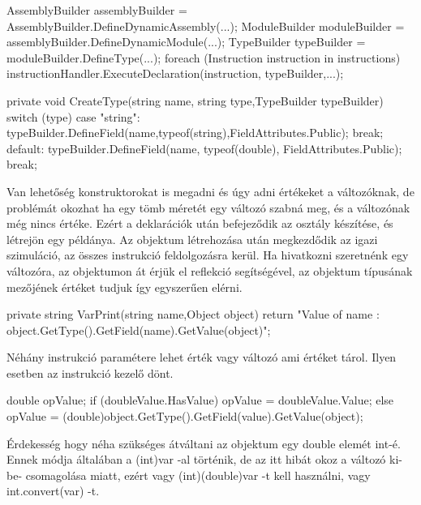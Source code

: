 \begin{cpp}
AssemblyBuilder assemblyBuilder = AssemblyBuilder.DefineDynamicAssembly(...);
ModuleBuilder moduleBuilder = assemblyBuilder.DefineDynamicModule(...);
TypeBuilder typeBuilder = moduleBuilder.DefineType(...);
foreach (Instruction instruction in instructions)
{
        instructionHandler.ExecuteDeclaration(instruction, typeBuilder,...);
}


private void CreateType(string name, string type,TypeBuilder typeBuilder)
        {
            switch (type)
            {
                case "string":
                    typeBuilder.DefineField(name,typeof(string),FieldAttributes.Public);
                    break;
                default:
                    typeBuilder.DefineField(name, typeof(double), FieldAttributes.Public);
                    break;
            }
        }
\end{cpp}

Van lehetőség konstruktorokat is megadni és úgy adni értékeket a változóknak, de problémát okozhat ha egy tömb méretét egy változó szabná meg, és a változónak még nincs értéke. Ezért a deklarációk után befejeződik az osztály készítése, és létrejön egy példánya.
Az objektum létrehozása után megkezdődik az igazi szimuláció, az összes instrukció feldolgozásra kerül. Ha hivatkozni szeretnénk egy változóra, az objektumon át érjük el reflekció segítségével, az objektum típusának mezőjének értéket tudjuk így egyszerűen elérni.

\begin{cpp}
private string VarPrint(string name,Object object)
        {
            return "Value of {name} : {object.GetType().GetField(name).GetValue(object)}";
        }
\end{cpp}

Néhány instrukció paramétere lehet érték vagy változó ami értéket tárol. Ilyen esetben az instrukció kezelő dönt.

\begin{cpp}
			double opValue;
            if (doubleValue.HasValue)
            {
                opValue = doubleValue.Value;
            }
            else
            {
                opValue = (double)object.GetType().GetField(value).GetValue(object);
            }
\end{cpp}

Érdekesség hogy néha szükséges átváltani az objektum egy double elemét int-é. Ennek módja általában a (int)var -al történik, de az itt hibát okoz a változó ki-be- csomagolása miatt, ezért vagy (int)(double)var -t kell használni, vagy int.convert(var) -t.

       



